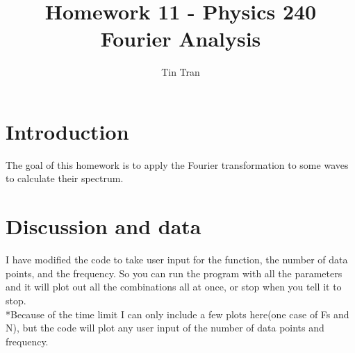 \documentclass{article}
\begin{document}
\title{Homework 11 - Physics 240\\
		Fourier Analysis}
\author{Tin Tran}

\maketitle

\section{Introduction}
The goal of this homework is to apply the Fourier transformation to some waves to calculate their spectrum.

\section{Discussion and data}
I have modified the code to take user input for the function, the number of data points, and the frequency. So you can run the program with all the parameters and it will plot out all the combinations all at once, or stop when you tell it to stop.\\
*Because of the time limit I can only include a few plots here(one case of Fs and N), but the code will plot any user input of the number of data points and frequency.

\begin{figure}[H]
\end{figure}
\end{document}

